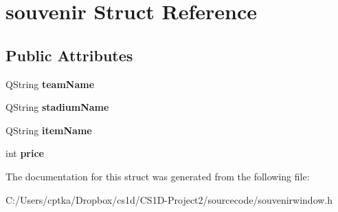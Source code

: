 \hypertarget{structsouvenir}{}\section{souvenir Struct Reference}
\label{structsouvenir}
\subsection*{Public Attributes}
\begin{DoxyCompactItemize}
\item 
\mbox{\label{structsouvenir_a11ff479446aca442ad0f7b27b2858d2b}} 
Q\+String {\bfseries team\+Name}
\item 
\mbox{\label{structsouvenir_a9859a996aa4d5621cc0115fa865589fd}} 
Q\+String {\bfseries stadium\+Name}
\item 
\mbox{\label{structsouvenir_aa71032f5c7931e1364b169359ecf1c91}} 
Q\+String {\bfseries item\+Name}
\item 
\mbox{\label{structsouvenir_adfae205676c03d58766a59a230c2d5db}} 
int {\bfseries price}
\end{DoxyCompactItemize}


The documentation for this struct was generated from the following file\+:\begin{DoxyCompactItemize}
\item 
C\+:/\+Users/cptka/\+Dropbox/cs1d/\+C\+S1\+D-\/\+Project2/sourcecode/souvenirwindow.\+h\end{DoxyCompactItemize}
